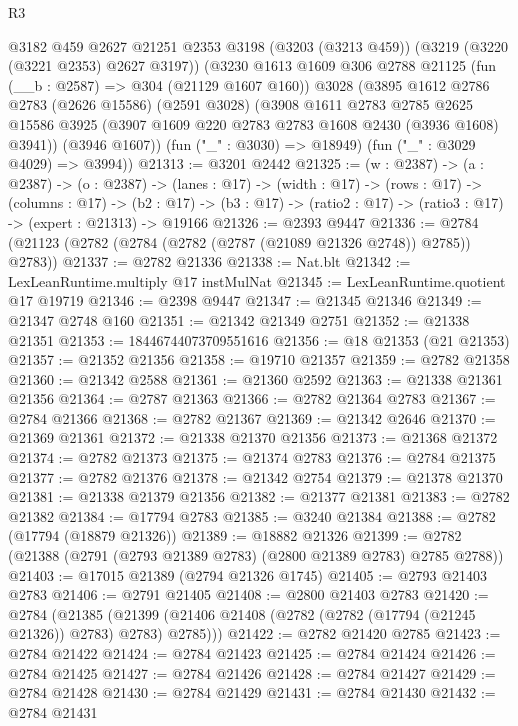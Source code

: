 \begin{lexlean}{R3}
\begin{coremodule}
  @3182
    @459
    @2627
    @21251
    @2353
    @3198
    (@3203 (@3213 @459))
    (@3219 (@3220 (@3221 @2353) @2627 @3197))
    (@3230
      @1613
      @1609
      @306
      @2788
      @21125
      (fun (__b : @2587) => @304 (@21129 @1607 @160))
      @3028
      (@3895
        @1612
        @2786
        @2783
        (@2626 @15586)
        (@2591 @3028)
        (@3908
          @1611
          @2783
          @2785
          @2625
          @15586
          @3925
          (@3907 @1609 @220 @2783 @2783 @1608 @2430 (@3936 @1608) @3941))
        (@3946 @1607))
      (fun ("_" : @3030) => @18949)
      (fun ("_" : @3029 @4029) => @3994))
@21313 := @3201 @2442
@21325 := (w : @2387) ->
  (a : @2387) ->
  (o : @2387) ->
  (lanes : @17) ->
  (width : @17) ->
  (rows : @17) ->
  (columns : @17) ->
  (b2 : @17) -> (b3 : @17) -> (ratio2 : @17) -> (ratio3 : @17) -> (expert : @21313) -> @19166
@21326 := @2393 @9447
@21336 := @2784 (@21123 (@2782 (@2784 (@2782 (@2787 (@21089 @21326 @2748)) @2785)) @2783))
@21337 := @2782 @21336
@21338 := Nat.blt
@21342 := LexLeanRuntime.multiply @17 instMulNat
@21345 := LexLeanRuntime.quotient @17 @19719
@21346 := @2398 @9447
@21347 := @21345 @21346
@21349 := @21347 @2748 @160
@21351 := @21342 @21349 @2751
@21352 := @21338 @21351
@21353 := 18446744073709551616
@21356 := @18 @21353 (@21 @21353)
@21357 := @21352 @21356
@21358 := @19710 @21357
@21359 := @2782 @21358
@21360 := @21342 @2588
@21361 := @21360 @2592
@21363 := @21338 @21361 @21356
@21364 := @2787 @21363
@21366 := @2782 @21364 @2783
@21367 := @2784 @21366
@21368 := @2782 @21367
@21369 := @21342 @2646
@21370 := @21369 @21361
@21372 := @21338 @21370 @21356
@21373 := @21368 @21372
@21374 := @2782 @21373
@21375 := @21374 @2783
@21376 := @2784 @21375
@21377 := @2782 @21376
@21378 := @21342 @2754
@21379 := @21378 @21370
@21381 := @21338 @21379 @21356
@21382 := @21377 @21381
@21383 := @2782 @21382
@21384 := @17794 @2783
@21385 := @3240 @21384
@21388 := @2782 (@17794 (@18879 @21326))
@21389 := @18882 @21326
@21399 := @2782 (@21388 (@2791 (@2793 @21389 @2783) (@2800 @21389 @2783) @2785 @2788))
@21403 := @17015 @21389 (@2794 @21326 @1745)
@21405 := @2793 @21403 @2783
@21406 := @2791 @21405
@21408 := @2800 @21403 @2783
@21420 := @2784
    (@21385 (@21399 (@21406 @21408 (@2782 (@2782 (@17794 (@21245 @21326)) @2783) @2783) @2785)))
@21422 := @2782 @21420 @2785
@21423 := @2784 @21422
@21424 := @2784 @21423
@21425 := @2784 @21424
@21426 := @2784 @21425
@21427 := @2784 @21426
@21428 := @2784 @21427
@21429 := @2784 @21428
@21430 := @2784 @21429
@21431 := @2784 @21430
@21432 := @2784 @21431

\end{coremodule}
\end{lexlean}
